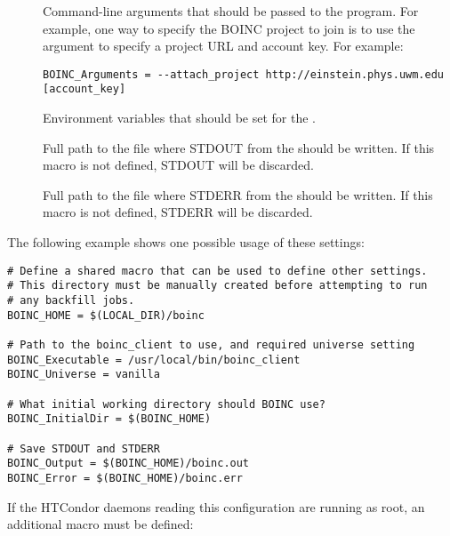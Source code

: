 \begin{description}

\item[] \label{param:BoincArguments}
  Command-line arguments that should be passed to the
   program.
  For example, one way to specify the BOINC project to join is to use 
  the  argument to specify a project URL and
  account key.
  For example:

\footnotesize
\begin{verbatim}
BOINC_Arguments = --attach_project http://einstein.phys.uwm.edu [account_key] 
\end{verbatim}
\normalsize

\item[] \label{param:BoincEnvironment}
  Environment variables that should be set for the
  .

\item[] \label{param:BoincOutput} Full path to
  the file where STDOUT from the  should be
  written.
  If this macro is not defined, STDOUT will be discarded.

\item[] \label{param:BoincError} Full path to
  the file where STDERR from the  should be
  written.
  If this macro is not defined, STDERR will be discarded.

\end{description}


The following example shows one possible usage of these settings:

\footnotesize
\begin{verbatim}
# Define a shared macro that can be used to define other settings.
# This directory must be manually created before attempting to run
# any backfill jobs.
BOINC_HOME = $(LOCAL_DIR)/boinc

# Path to the boinc_client to use, and required universe setting
BOINC_Executable = /usr/local/bin/boinc_client
BOINC_Universe = vanilla

# What initial working directory should BOINC use?
BOINC_InitialDir = $(BOINC_HOME)

# Save STDOUT and STDERR
BOINC_Output = $(BOINC_HOME)/boinc.out
BOINC_Error = $(BOINC_HOME)/boinc.err
\end{verbatim}
\normalsize

If the HTCondor daemons reading this configuration are running as root,
an additional macro must be defined:

